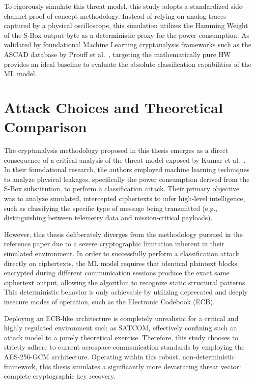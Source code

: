 \documentclass[11pt,a4paper]{report}
\begin{document}
To rigorously simulate this threat model, this study adopts a standardized side-channel proof-of-concept methodology. 
Instead of relying on analog traces captured by a physical oscilloscope, this simulation utilizes the Hamming Weight of the S-Box output byte as a deterministic proxy for the power consumption. 
As validated by foundational Machine Learning cryptanalysis frameworks such as the ASCAD database by Prouff et al.~\cite{HW_proof-of-concept}, targeting the mathematically pure HW provides an ideal baseline to evaluate the absolute classification capabilities of the ML model.

\section{Attack Choices and Theoretical Comparison}
The cryptanalysis methodology proposed in this thesis emerges as a direct consequence of a critical analysis of the threat model exposed by Kumar et al.~\cite{KumarPaper}. 
In their foundational research, the authors employed machine learning techniques to analyze physical leakages, specifically the power consumption derived from the S-Box substitution, to perform a classification attack. 
Their primary objective was to analyze simulated, intercepted ciphertexts to infer high-level intelligence, such as classifying the specific type of message being transmitted (e.g., distinguishing between telemetry data and mission-critical payloads).

However, this thesis deliberately diverges from the methodology pursued in the reference paper due to a severe cryptographic limitation inherent in their simulated environment. 
In order to successfully perform a classification attack directly on ciphertexts, the ML model requires that identical plaintext blocks encrypted during different communication sessions produce the exact same ciphertext output, allowing the algorithm to recognize static structural patterns. 
This deterministic behavior is only achievable by utilizing deprecated and deeply insecure modes of operation, such as the Electronic Codebook (ECB). 

Deploying an ECB-like architecture is completely unrealistic for a critical and highly regulated environment such as SATCOM, 
effectively confining such an attack model to a purely theoretical exercise. 
Therefore, this study chooses to strictly adhere to current aerospace communication standards by employing the AES-256-GCM architecture. 
Operating within this robust, non-deterministic framework, this thesis simulates a significantly more devastating threat vector: complete cryptographic key recovery.
\end{document}
